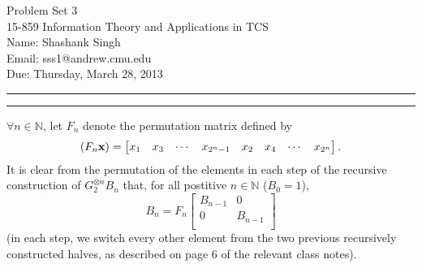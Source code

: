 \documentclass[11pt]{article}
\makeatletter
\newcounter{questionCounter}
\newcounter{partCounter}[questionCounter]
\newenvironment{question}[2][\arabic{questionCounter}]{%
    \setcounter{partCounter}{0}%
    \vspace{.25in} \hrule \vspace{0.5em}%
        \noindent{\bf #2}%
    \vspace{0.8em} \hrule \vspace{.10in}%
    \addtocounter{questionCounter}{1}%
}{}
\newcommand{\name}{Shashank Singh}
\newcommand{\andrew}{sss1@andrew.cmu.edu}
\newcommand{\class}{15-859 Information Theory and Applications in TCS}
\newcommand{\hwnum}{3}
\newcommand{\duedate}{Thursday, March 28, 2013}
\newcommand{\N}{\mathbb{N}} %
\makeatother
\begin{document}
\thispagestyle{plain}

{\Large Problem Set \hwnum} \\
\class \\
Name: \name \\
Email: \andrew \\
Due: \duedate

\begin{question}{Problem 1}
$\forall n \in \N$, let $F_n$ denote the permutation matrix defined by
\[(F_n \bf x) = 
    \begin{bmatrix}
        x_1 & x_3 & \cdots & x_{2^n - 1} & x_2 & x_4 & \cdots & x_{2^n}
    \end{bmatrix}.
\]
It is clear from the permutation of the elements in each step of the recursive
construction of $G_2^{\otimes n} B_n$ that, for all postitive $n \in \N$
($B_0 = 1$),
\[B_n = F_n
    \begin{bmatrix}
        B_{n - 1} & 0 \\
        0 & B_{n - 1} \\
    \end{bmatrix}
\]
(in each step, we switch every other element from the two previous recursively
constructed halves, as described on page 6 of the relevant class notes).


\end{question}
\end{document}

